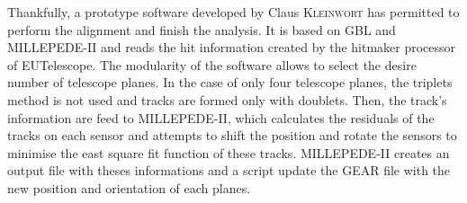 

       


    Thankfully, a prototype software developed by Claus \textsc{Kleinwort} has permitted to perform the alignment and finish the analysis. 
    It is based on \gls{GBL} and MILLEPEDE-II and reads the hit information created by the hitmaker processor of EUTelescope. 
    The modularity of the software allows to select the desire number of telescope planes.
    In the case of only four telescope planes, the triplets method is not used and tracks are formed only with doublets.
    Then, the track's information are feed to MILLEPEDE-II, which calculates the residuals of the tracks on each sensor and attempts to shift the position and rotate the sensors to minimise the east square fit function of these tracks.
    MILLEPEDE-II creates an output file with theses informations and a script update the GEAR file with the new position and orientation of each planes.




